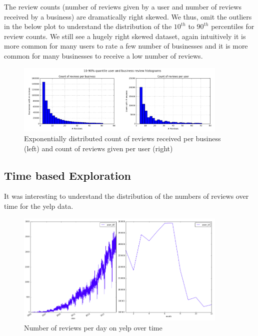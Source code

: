 \documentclass[11pt]{article}
\begin{document}
\par The review counts (number of reviews given by a user and number of reviews received by a business) are dramatically right skewed. We thus, omit the outliers in the below plot to understand the distribution of the $10^{th}$ to $90^{th}$ percentiles for review counts. We still see a hugely right skewed dataset, again intuitively it is more common for many users to rate a few number of businesses and it is more common for many businesses to receive a low number of reviews.

\begin{figure}[H]
\centering
\includegraphics[width=0.9\textwidth]{./ac209/user-and-business-review-hists-fixed.png}
\caption{Exponentially distributed count of reviews received per business (left) and count of reviews given per user (right)}
\end{figure}


\subsection*{Time based Exploration}
It was interesting to understand the distribution of the numbers of reviews over time for the yelp data.

\begin{figure}[H]
\centering
\includegraphics[width=0.9\textwidth]{./ac209/timeseries.png}
\caption{Number of reviews per day on yelp over time}
\end{figure}
\end{document}
